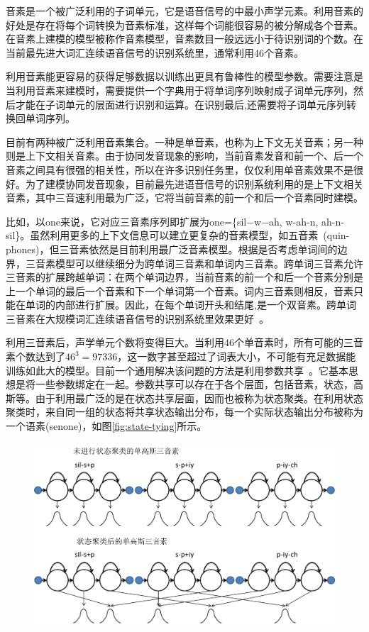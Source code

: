 音素是一个被广泛利用的子词单元，它是语音信号的中最小声学元素。利用音素的好处是存在将每个词转换为音素标准，这样每个词能很容易的被分解成各个音素。在音素上建模的模型被称作音素模型，音素数目一般远远小于待识别词的个数。在当前最先进大词汇连续语音信号的识别系统里，通常利用46个音素。

利用音素能更容易的获得足够数据以训练出更具有鲁棒性的模型参数。需要注意是当利用音素来建模时，需要提供一个字典用于将单词序列映射成子词单元序列，然后才能在子词单元的层面进行识别和运算。在识别最后,还需要将子词单元序列转换回单词序列。

目前有两种被广泛利用音素集合。一种是单音素，也称为上下文无关音素；另一种则是上下文相关音素。由于协同发音现象的影响，当前音素发音和前一个、后一个音素之间具有很强的相关性，所以在许多识别任务里，仅仅利用单音素效果不是很好。为了建模协同发音现象，目前最先进语音信号的识别系统利用的是上下文相关音素，其中三音速利用最为广泛，它将当前音素的前一个和后一个音素同时建模。

比如，以one来说，它对应三音素序列即扩展为one=\{sil−w−ah, w-ah-n, ah-n-sil\}。虽然利用更多的上下文信息可以建立更复杂的音素模型，如五音素~\cite{hain2005automatic}(quin-phones)，但三音素依然是目前利用最广泛音素模型。根据是否考虑单词间的边界，三音素模型可以继续细分为跨单词三音素和单词内三音素。跨单词三音素允许三音素的扩展跨越单词：在两个单词边界，当前音素的前一个和后一个音素分别是上一个单词的最后一个音素和下一个单词第一个音素。词内三音素则相反，音素只能在单词的内部进行扩展。因此，在每个单词开头和结尾,是一个双音素。跨单词三音素在大规模词汇连续语音信号的识别系统里效果更好~\cite{woodland1994large}。

利用三音素后，声学单元个数将变得巨大。当利用46个单音素时，所有可能的三音素个数达到了$46^3=97336$，这一数字甚至超过了词表大小，不可能有充足数据能训练如此大的模型。目前一个通用解决该问题的方法是利用参数共享~\cite{young1993use, young1994tree}。它基本思想是将一些参数绑定在一起。参数共享可以存在于各个层面，包括音素，状态，高斯等。由于利用最广泛的是在状态共享层面，因而也被称为状态聚类。在利用状态聚类时，来自同一组的状态将共享状态输出分布，每一个实际状态输出分布被称为一个语素(senone)，如图\ref{fig:state-tying}所示。
\begin{figure}[!htp]
  \centering
    \captionstyle{\centering}
    \includegraphics[width=.8\textwidth]{figure/state.png}
\end{figure}

